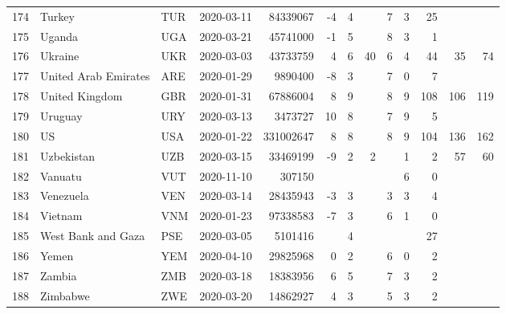 \begin{longtable}{rlllrrrrrrrrr}
  174 & Turkey & TUR & 2020-03-11 & 84339067 & -4 & 4 &  & 7 & 3 & 25 &  &  \\ 
  175 & Uganda & UGA & 2020-03-21 & 45741000 & -1 & 5 &  & 8 & 3 & 1 &  &  \\ 
  176 & Ukraine & UKR & 2020-03-03 & 43733759 & 4 & 6 & 40 & 6 & 4 & 44 & 35 & 74 \\ 
  177 & United Arab Emirates & ARE & 2020-01-29 & 9890400 & -8 & 3 &  & 7 & 0 & 7 &  &  \\ 
  178 & United Kingdom & GBR & 2020-01-31 & 67886004 & 8 & 9 &  & 8 & 9 & 108 & 106 & 119 \\ 
  179 & Uruguay & URY & 2020-03-13 & 3473727 & 10 & 8 &  & 7 & 9 & 5 &  &  \\ 
  180 & US & USA & 2020-01-22 & 331002647 & 8 & 8 &  & 8 & 9 & 104 & 136 & 162 \\ 
  181 & Uzbekistan & UZB & 2020-03-15 & 33469199 & -9 & 2 & 2 &  & 1 & 2 & 57 & 60 \\ 
  182 & Vanuatu & VUT & 2020-11-10 & 307150 &  &  &  &  & 6 & 0 &  &  \\ 
  183 & Venezuela & VEN & 2020-03-14 & 28435943 & -3 & 3 &  & 3 & 3 & 4 &  &  \\ 
  184 & Vietnam & VNM & 2020-01-23 & 97338583 & -7 & 3 &  & 6 & 1 & 0 &  &  \\ 
  185 & West Bank and Gaza & PSE & 2020-03-05 & 5101416 &  & 4 &  &  &  & 27 &  &  \\ 
  186 & Yemen & YEM & 2020-04-10 & 29825968 & 0 & 2 &  & 6 & 0 & 2 &  &  \\ 
  187 & Zambia & ZMB & 2020-03-18 & 18383956 & 6 & 5 &  & 7 & 3 & 2 &  &  \\ 
  188 & Zimbabwe & ZWE & 2020-03-20 & 14862927 & 4 & 3 &  & 5 & 3 & 2 &  &  \\ 
   \hline
\hline
\end{longtable}
\endgroup
